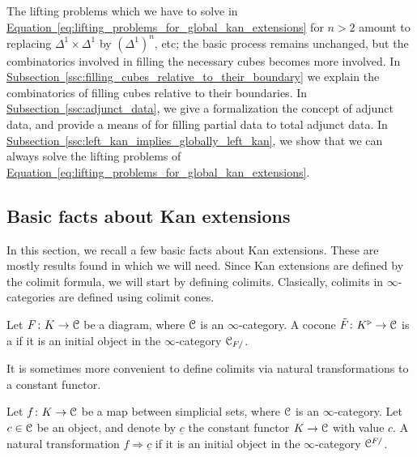 \documentclass[main.tex]{subfiles}
\begin{document}
The lifting problems which we have to solve in \hyperref[eq:lifting_problems_for_global_kan_extensions]{Equation~\ref*{eq:lifting_problems_for_global_kan_extensions}} for $n > 2$ amount to replacing $\Delta^{1} \times \Delta^{1}$ by $(\Delta^{1})^{n}$, etc; the basic process remains unchanged, but the combinatorics involved in filling the necessary cubes becomes more involved. In \hyperref[ssc:filling_cubes_relative_to_their_boundary]{Subsection~\ref*{ssc:filling_cubes_relative_to_their_boundary}} we explain the combinatorics of filling cubes relative to their boundaries. In \hyperref[ssc:adjunct_data]{Subsection~\ref*{ssc:adjunct_data}}, we give a formalization the concept of adjunct data, and provide a means of for filling partial data to total adjunct data. In \hyperref[ssc:left_kan_implies_globally_left_kan]{Subsection~\ref*{ssc:left_kan_implies_globally_left_kan}}, we show that we can always solve the lifting problems of \hyperref[eq:lifting_problems_for_global_kan_extensions]{Equation~\ref*{eq:lifting_problems_for_global_kan_extensions}}.

\subsection{Basic facts about Kan extensions}
\label{ssc:basic_facts_about_kan_extensions}

In this section, we recall a few basic facts about Kan extensions. These are mostly results found in \cite{kerodon} which we will need. Since Kan extensions are defined by the colimit formula, we will start by defining colimits. Clasically, colimits in $\infty$-categories are defined using colimit cones.

\begin{definition}
  \label{def:colimit_via_cocones}
  Let $F\colon K \to \mathcal{C}$ be a diagram, where $\mathcal{C}$ is an $\infty$-category. A cocone $\tilde{F}\colon K^{\triangleright} \to \mathcal{C}$ is a  if it is an initial object in the $\infty$-category $\mathcal{C}_{F/}$.
\end{definition}

It is sometimes more convenient to define colimits via natural transformations to a constant functor.

\begin{definition}
  Let $f\colon K \to \mathcal{C}$ be a map between simplicial sets, where $\mathcal{C}$ is an $\infty$-category. Let $c \in \mathcal{C}$ be an object, and denote by $\underline{c}$ the constant functor $K \to \mathcal{C}$ with value $c$. A natural transformation $f \Rightarrow \underline{c}$  if it is an initial object in the $\infty$-category $\mathcal{C}^{F/}$.
\end{definition}
\end{document}
